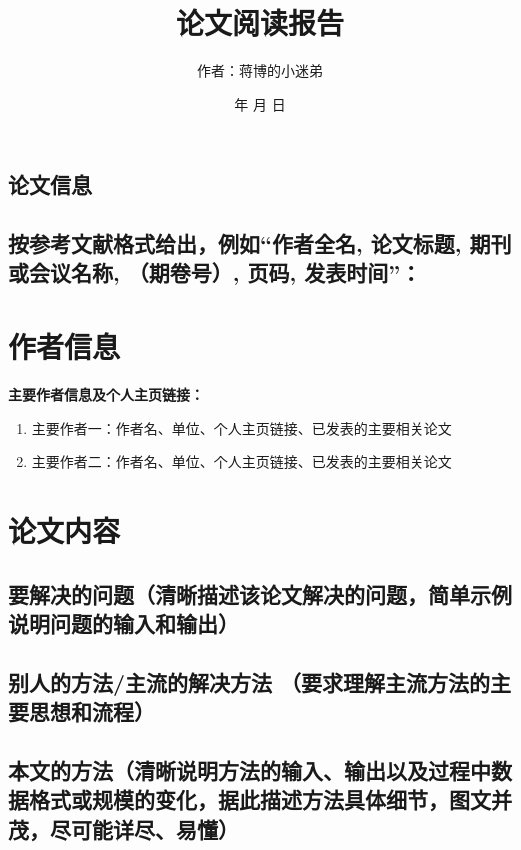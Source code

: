 \documentclass[UTF8]{article}
\begin{document}
	\lhead{}
	\chead{}
	\lfoot{}
	\cfoot{\thepage}
	\rfoot{}
	\renewcommand{\headrulewidth}{0.4pt}
	\renewcommand{\footrulewidth}{0pt} 
	\title{\LARGE \textbf{论文阅读报告}}
	\author{作者：蒋博的小迷弟}
	\date{ \number\year 年 \number\month 月 \number\day 日}
	\maketitle
	\thispagestyle{fancy}
\begin{center} 
\section{论文信息}
\end{center}
\subsection{按参考文献格式给出，例如“作者全名, 论文标题, 期刊或会议名称, （期卷号）, 页码, 发表时间”：}

\section{作者信息}
\large \textbf{主要作者信息及个人主页链接：}
\begin{enumerate}
\item{主要作者一：作者名、单位、个人主页链接、已发表的主要相关论文} \\

\item{主要作者二：作者名、单位、个人主页链接、已发表的主要相关论文}\\
\end{enumerate}

\section{论文内容}
\subsection{要解决的问题（清晰描述该论文解决的问题，简单示例说明问题的输入和输出）}
 
\subsection{别人的方法/主流的解决方法 （要求理解主流方法的主要思想和流程）}

\subsection{本文的方法（清晰说明方法的输入、输出以及过程中数据格式或规模的变化，据此描述方法具体细节，图文并茂，尽可能详尽、易懂）}
\end{document}
